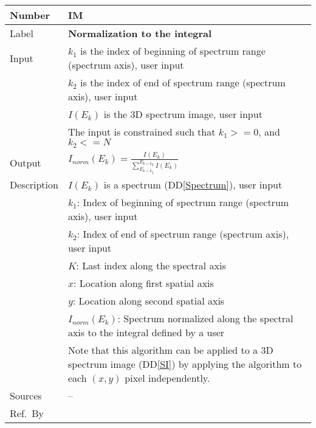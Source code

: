 \documentclass[12pt]{article}
\newcommand{\colAwidth}{0.13\textwidth}
\newcommand{\colBwidth}{0.82\textwidth}
\newcommand{\ddref}[1]{DD\ref{#1}}
\newcounter{instnum} %
\begin{document}

\noindent
\begin{minipage}{\textwidth}
	\renewcommand*{\arraystretch}{1.5}
	\begin{tabular}{| p{\colAwidth} | p{\colBwidth}|}
		  \hline
		  \rowcolor[gray]{0.9}
		  Number& IM{instnum}\theinstnum \label{normalization}\\
		  \hline
		  Label& \bf Normalization to the integral\\
		  \hline
		  Input& $k_1$  is the index of beginning of spectrum range (spectrum axis), user input\\
		  & $k_2$ is the index of end of spectrum range (spectrum axis), user input\\
		  & $I(E_k)$ is the 3D spectrum image, user input\\
		  & The input is constrained such that $k_1 >= 0$, and $k_2 <= N$\\
		  \hline
		  Output& $I_{norm}(E_k)=\frac{I(E_k)}{\sum_{E_{k=k_1}}^{E_{k=k_2}} I(E_k)}$\\
		  \hline
		  Description&$I(E_k)$ is a spectrum (\ddref{Spectrum}), user input\\
		  &$k_1$: Index of beginning of spectrum range (spectrum axis), user input\\
		  &$k_2$: Index of end of spectrum range (spectrum axis), user input\\
		  &$K$: Last index along the spectral axis\\
		  &$x$: Location along first spatial axis\\
		  &$y$: Location along second spatial axis\\
		  &$I_{norm}(E_k)$: Spectrum normalized along the spectral axis to the integral defined by a user\\
		  & Note that this algorithm can be applied to a 3D spectrum image (\ddref{SI}) by applying the algorithm to each $(x,y)$ pixel independently.\\
		  \hline
		  Sources & -- \\
		  \hline
		  Ref.\ By & \\
		  \hline
	\end{tabular}
\end{minipage}\\

~\newline

\end{document}
